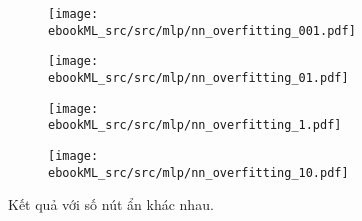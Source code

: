 \begin{figure}[t]
\begin{subfigure}{0.45\textwidth}
\texttt{[image: ebookML\_src/src/mlp/nn\_overfitting\_001.pdf]}
\caption{}
\end{subfigure}
\begin{subfigure}{0.45\textwidth}
\texttt{[image: ebookML\_src/src/mlp/nn\_overfitting\_01.pdf]}
\caption{}
\end{subfigure}

\begin{subfigure}{0.45\textwidth}
\texttt{[image: ebookML\_src/src/mlp/nn\_overfitting\_1.pdf]}
\caption{}
\end{subfigure}
\begin{subfigure}{0.45\textwidth}
\texttt{[image: ebookML\_src/src/mlp/nn\_overfitting\_10.pdf]}
\caption{}
\end{subfigure}
\caption{
Kết quả với số nút ẩn khác nhau.
}
\label{fig:14_11}
\end{figure}








